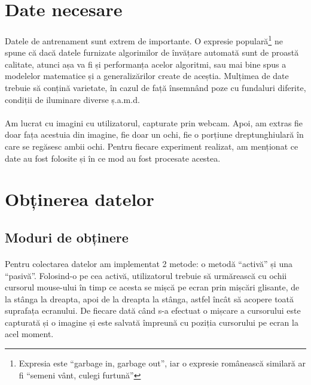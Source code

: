 \section{Date necesare}
\paragraph{}
Datele de antrenament sunt extrem de importante.
O expresie populară\footnote{Expresia este ``garbage in, garbage out'', iar o expresie românească similară ar fi ``semeni vânt, culegi furtună''} ne spune că dacă datele furnizate algorimilor de învățare automată sunt de proastă calitate, atunci așa va fi și performanța acelor algoritmi, sau mai bine spus a modelelor matematice și a generalizărilor create de aceștia.
Mulțimea de date trebuie să conțină varietate, în cazul de față însemnând poze cu fundaluri diferite, condiții de iluminare diverse ș.a.m.d.

\paragraph{}
Am lucrat cu imagini cu utilizatorul, capturate prin webcam.
Apoi, am extras fie doar fața acestuia din imagine, fie doar un ochi, fie o porțiune dreptunghiulară în care se regăsesc ambii ochi.
Pentru fiecare experiment realizat, am menționat ce date au fost folosite și în ce mod au fost procesate acestea.

\section{Obținerea datelor}

\subsection{Moduri de obținere}
\paragraph{}
Pentru colectarea datelor am implementat 2 metode: o metodă ``activă'' și una ``pasivă''.
Folosind-o pe cea activă, utilizatorul trebuie să urmărească cu ochii cursorul mouse-ului în timp ce acesta se mișcă pe ecran prin mișcări glisante, de la stânga la dreapta, apoi de la dreapta la stânga, astfel încât să acopere toată suprafața ecranului.
De fiecare dată când s-a efectuat o mișcare a cursorului este capturată și o imagine și este salvată împreună cu poziția cursorului pe ecran la acel moment.

